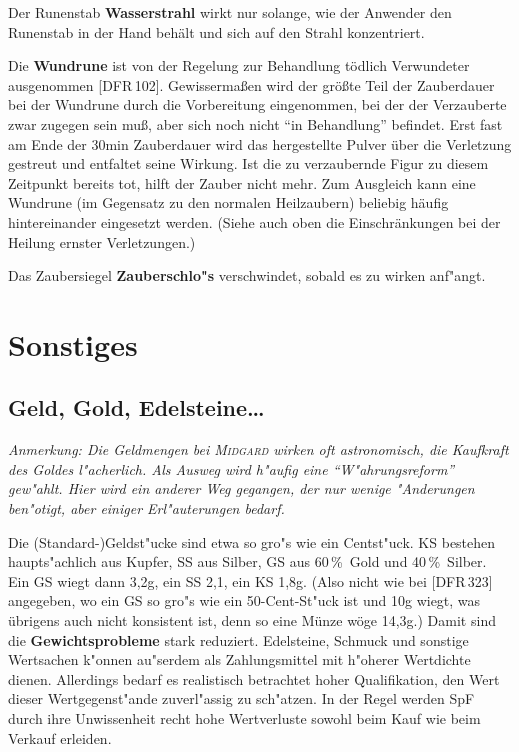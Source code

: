 \documentclass[10pt,a4paper,germanpar]{article}
\begin{document}
Der Runenstab \textbf{Wasserstrahl} wirkt nur solange, wie der
Anwender den Runenstab in der Hand behält und sich auf den Strahl
konzentriert.

Die \textbf{Wundrune} ist von der Regelung zur Behandlung tödlich
Verwundeter ausgenommen [DFR\,102]. Gewissermaßen wird der größte Teil
der Zauberdauer bei der Wundrune durch die Vorbereitung eingenommen,
bei der der Verzauberte zwar zugegen sein muß, aber sich noch nicht
"`in Behandlung"' befindet. Erst fast am Ende der 30min Zauberdauer
wird das hergestellte Pulver über die Verletzung gestreut und
entfaltet seine Wirkung. Ist die zu verzaubernde Figur zu diesem
Zeitpunkt bereits tot, hilft der Zauber nicht mehr. Zum Ausgleich kann
eine Wundrune (im Gegensatz zu den normalen Heilzaubern) beliebig
häufig hintereinander eingesetzt werden. (Siehe auch oben die
Einschränkungen bei der Heilung ernster Verletzungen.)

Das Zaubersiegel \textbf{Zauberschlo"s} verschwindet, sobald es zu
wirken anf"angt.



\section{Sonstiges}

\subsection{Geld, Gold, Edelsteine\dots}

\emph{Anmerkung: Die Geldmengen bei \textsc{Midgard} wirken oft
  astronomisch, die Kaufkraft des Goldes l"acherlich. Als Ausweg wird
  h"aufig eine "`W"ahrungsreform"' gew"ahlt. Hier wird ein anderer Weg
  gegangen, der nur wenige "Anderungen ben"otigt, aber einiger
  Erl"auterungen bedarf.}

Die (Standard-)Geldst"ucke sind etwa so gro"s wie ein Centst"uck.
KS bestehen haupts"achlich aus Kupfer, SS aus Silber, GS aus 60\,\%\ 
Gold und 40\,\%\ Silber. Ein GS wiegt dann 3,2g, ein SS 2,1, ein KS
1,8g.  (Also nicht wie bei [DFR\,323] angegeben, wo ein GS so gro"s
wie ein 50-Cent-St"uck ist und 10g wiegt, was übrigens auch nicht
konsistent ist, denn so eine Münze wöge 14,3g.)  Damit sind die
\textbf{Gewichtsprobleme} stark reduziert. Edelsteine, Schmuck und
sonstige Wertsachen k"onnen au"serdem als Zahlungsmittel mit h"oherer
Wertdichte dienen.  Allerdings bedarf es realistisch betrachtet hoher
Qualifikation, den Wert dieser Wertgegenst"ande zuverl"assig zu
sch"atzen. In der Regel werden SpF durch ihre Unwissenheit recht hohe
Wertverluste sowohl beim Kauf wie beim Verkauf erleiden.
\end{document}
